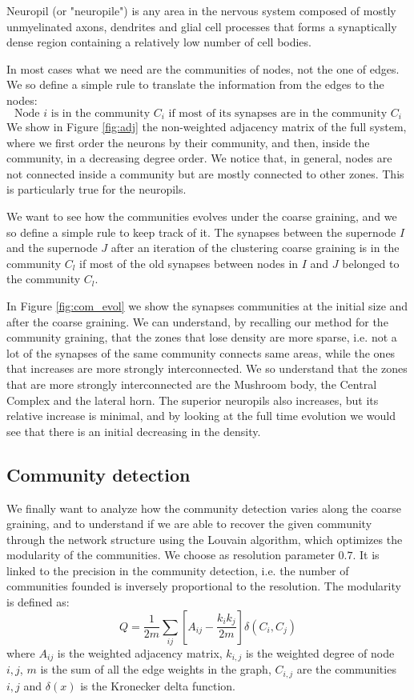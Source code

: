 Neuropil (or "neuropile") is any area in the nervous system composed of mostly unmyelinated axons, dendrites and glial 
cell processes that forms a synaptically dense region containing a relatively low 
number of cell bodies. 

In most cases what we need are the communities of nodes, not the one of edges. We so define a 
simple rule to translate the information from the edges to the nodes: 
$$
\mbox{Node $i$ is in the community $C_i$ if most of its synapses are in the community $C_i$}
$$
We show in Figure \ref{fig:adj} the non-weighted adjacency matrix of the full system, where we
first order the neurons by their community, and then, inside the community, in a decreasing 
degree order. We notice that, in general, nodes are not connected inside a community but are 
mostly connected to other zones. This is particularly true for the neuropils.

We want to see how the communities evolves under the coarse graining, and we so define a simple rule
to keep track of it. The synapses between the supernode $I$ and the supernode $J$ after an iteration
of the clustering coarse graining is in the community $C_l$ if most of the old synapses between
nodes in $I$ and $J$ belonged to the community $C_l$.

In Figure \ref{fig:com_evol} we show the synapses communities at the initial size and after the
coarse graining. We can understand, by recalling our method for the community graining, that the 
zones that lose density are more sparse, i.e. not a lot of the synapses of the same community connects
same areas, while the ones that increases are more strongly interconnected. We so understand that the zones
that are more strongly interconnected are the Mushroom body, the Central Complex and the lateral horn.
The superior neuropils also increases, but its relative increase is minimal, and by looking at the 
full time evolution we would see that there is an initial decreasing in the density.

\subsection{Community detection}
We finally want to analyze how the community detection varies along the coarse 
graining, and to understand if we are able to recover the given community through
the network structure using the Louvain algorithm, which optimizes the modularity
of the communities. We choose as resolution parameter $0.7$. It is 
linked to the precision in the community detection, i.e. the number 
of communities founded is inversely proportional to the resolution.
The modularity is defined as:
\begin{equation}
    Q = \frac{1}{2m}\sum_{ij} \left[A_{ij}-\frac{k_ik_j}{2m}\right] \delta(C_i, C_j)
\end{equation}
where $A_{ij}$ is the weighted adjacency matrix, $k_{i,j}$ is the weighted degree of node $i,j$,
$m$ is the sum of all the edge weights in the graph, $C_{i,j}$ are the communities $i,j$ and $\delta(x)$ is the
Kronecker delta function.

